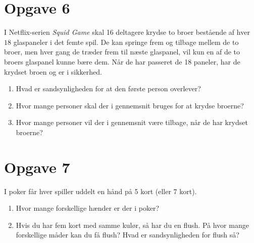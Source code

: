 \documentclass[12pt]{article}
\begin{document}
\section*{Opgave 6}
I Netflix-serien \textit{Squid Game} skal 16 deltagere krydse to broer bestående af hver $18$ glaspaneler i det femte spil. De kan springe frem og tilbage mellem de to broer, men hver gang de træder frem til næste glaspanel, vil kun en af de to broers glaspanel kunne bære dem. Når de har passeret de 18 paneler, har de krydset broen og er i sikkerhed.
\begin{enumerate}[label=\roman*)]
\item Hvad er sandsynligheden for at den første person overlever?
\item Hvor mange personer skal der i gennemsnit bruges for at krydse broerne? 
\item Hvor mange personer vil der i gennemsnit være tilbage, når de har krydset broerne?
\end{enumerate}


\section*{Opgave 7}
I poker får hver spiller uddelt en hånd på 5 kort (eller 7 kort). 
\begin{enumerate}[label=\roman*)]
\item Hvor mange forskellige hænder er der i poker?
\item Hvis du har fem kort med samme kulør, så har du en flush. På hvor mange forskellige måder kan du få flush? Hvad er sandsynligheden for flush så?
\end{enumerate}
\end{document}
